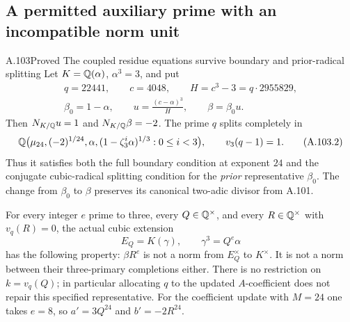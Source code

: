 \subsection{A permitted auxiliary prime with an incompatible norm unit}

\begin{statement}{A.103}{Proved}
{The coupled residue equations survive boundary and prior-radical splitting}
Let $K=\mathbb Q(\alpha)$, $\alpha^3=3$, and put
\[
 \begin{gathered}
 q=22441,\qquad c=4048,\qquad H=c^3-3=q\cdot2955829,\\
 \beta_0=1-\alpha,\qquad
 u=\frac{(c-\alpha)^3}{H},\qquad \beta=\beta_0u.
 \end{gathered}
 \tag{A.103.1}
\]
Then $N_{K/\mathbb Q}u=1$ and $N_{K/\mathbb Q}\beta=-2$.
The prime $q$ splits completely in
\[
 \mathbb Q\bigl(\mu_{24},(-2)^{1/24},\alpha,
                 (1-\zeta_3^i\alpha)^{1/3}:0\le i<3\bigr),
 \qquad v_3(q-1)=1.
 \tag{A.103.2}
\]
Thus it satisfies both the full boundary condition at
exponent $24$ and the conjugate cubic-radical splitting
condition for the \emph{prior} representative $\beta_0$.
The change from $\beta_0$ to $\beta$ preserves its canonical
two-adic divisor from A.101.

For every integer $e$ prime to three, every
$Q\in\mathbb Q^\times$, and every $R\in\mathbb Q^\times$ with
$v_q(R)=0$, the actual cubic extension
\[
 E_Q=K(\gamma),\qquad \gamma^3=Q^e\alpha
 \tag{A.103.3}
\]
has the following property:
$\beta R^e$ is not a norm from $E_Q^\times$ to $K^\times$.
It is not a norm between their three-primary completions
either.
There is no restriction on $k=v_q(Q)$; in particular
allocating $q$ to the updated $A$-coefficient does not
repair this specified representative.
For the coefficient update with $M=24$ one takes $e=8$,
so $a'=3Q^{24}$ and $b'=-2R^{24}$.
\end{statement}
